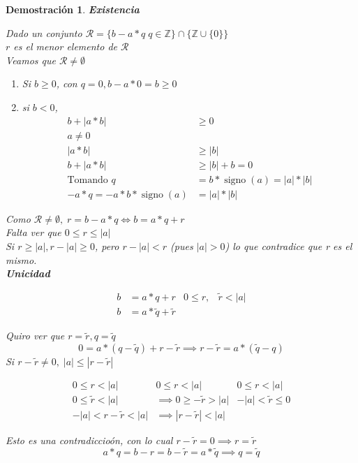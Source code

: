 \documentclass[9pt,a4paper,draft]{article}
\theoremstyle{definition}
\theoremstyle{plain}
\newtheorem{demo}{Demostración}[teo]
\DeclareMathOperator{\sig}{signo}
\begin{document}
\begin{demo} {\bfseries Existencia}

Dado un conjunto $\mathcal{R} = \{ b-a*q\; q\in{\mathbb{Z}}\}\cap\{\mathbb{Z}\cup\{0\}\}$ \\
$r$ es el menor elemento de $\mathcal{R}$ \\
Veamos que $\mathcal{R}\neq\emptyset$

\begin{enumerate}
\item Si $b\geq0$, con $q=0, b-a*0 = b \geq 0$
\item si $b<0$,
\begin{align*}
b+|a*b| &\geq 0\\
a \neq 0\\
|a*b| &\geq |b|\\
b+|a*b| &\geq |b|+b = 0\\
\text{Tomando } q &= b * \sig(a) = |a|*|b|\\
-a*q = -a*b*\sig(a) &= |a|*|b|
\end{align*}
\end{enumerate}

Como $\mathcal{R}\neq{\emptyset},\; r=b-a*q \iff b=a*q+r$\\
Falta ver que $0\leq{r}\leq{|a|}$\\
Si $r\geq{|a|}, r-|a|\geq{0}$, pero $r-|a|<r$ (pues $|a|>0$) lo que contradice que r es el mismo.\\

{\bfseries Unicidad} 

\begin{align*}
b &= a*q+r & 0\leq{r}, & \tilde{r} < |a|\\
b &= a*\tilde{q}+\tilde{r}
\end{align*}

Quiro ver que $r=\tilde{r}, q=\tilde{q}$
$$0=a*(q-\tilde{q})+r-\tilde{r}\implies r-\tilde{r}=a*(\tilde{q}-q)$$
Si $r-\tilde{r}\neq0,\; |a|\leq|r-\tilde{r}|$

\begin{align*}
0\leq{r}<|a| & 0\leq{r}<|a| & 0\leq{r}<|a|\\
0\leq{\tilde{r}}<|a| &\implies 0\geq-\tilde{r}>|a| & -|a|<\tilde{r}\leq{0}\\
-|a|<r-\tilde{r}<|a| &\implies |r-\tilde{r}| < |a|
\end{align*}

Esto es una contradiccioón, con lo cual $r-\tilde{r}=0\implies r=\tilde{r}$
$$a*q=b-r=b-\tilde{r}=a*\tilde{q}\implies q=\tilde{q}$$
\end{demo}
\end{document}
